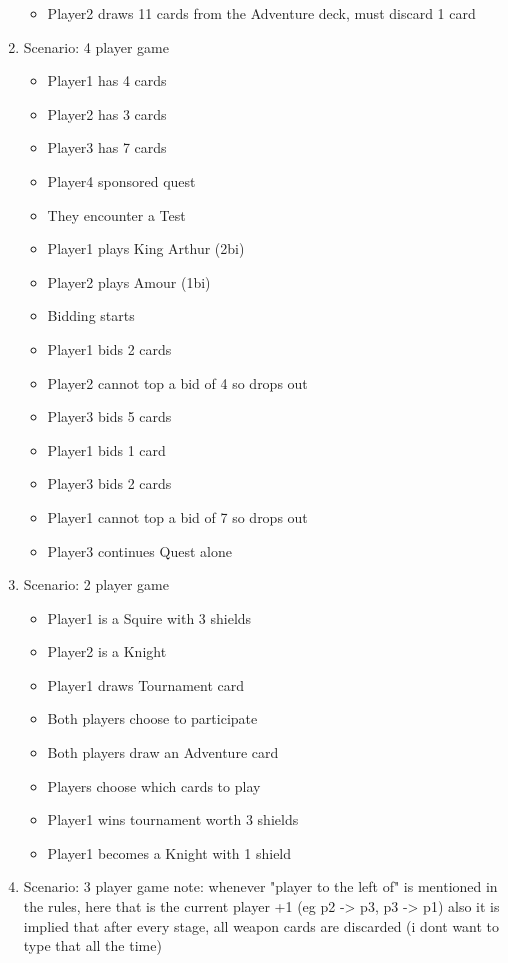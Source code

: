 \documentclass[11pt]{article}
\begin{document}
\begin{enumerate}
\begin{itemize}
	\item Player2 draws 11 cards from the Adventure deck, must discard 1 card
	\end{itemize}
\item Scenario: 4 player game
	\begin{itemize}
	\item Player1 has 4 cards
	\item Player2 has 3 cards
	\item Player3 has 7 cards
	\item Player4 sponsored quest
	\item They encounter a Test
	\item Player1 plays King Arthur (2bi)
	\item Player2 plays Amour (1bi)
	\item Bidding starts
	\item Player1 bids 2 cards
	\item Player2 cannot top a bid of 4 so drops out
	\item Player3 bids 5 cards
	\item Player1 bids 1 card
	\item Player3 bids 2 cards
	\item Player1 cannot top a bid of 7 so drops out
	\item Player3 continues Quest alone
	\end{itemize}

\item Scenario: 2 player game
	\begin{itemize}
	\item Player1 is a Squire with 3 shields
	\item Player2 is a Knight
	\item Player1 draws Tournament card
	\item Both players choose to participate
	\item Both players draw an Adventure card
	\item Players choose which cards to play
	\item Player1 wins tournament worth 3 shields
	\item Player1 becomes a Knight with 1 shield
	\end{itemize}


\item Scenario: 3 player game
note: whenever "player to the left of" is mentioned in the rules, here that is the current player +1 (eg p2 -> p3, p3 -> p1)
also it is implied that after every stage, all weapon cards are discarded (i dont want to type that all the time)


\end{enumerate}
\end{document}

